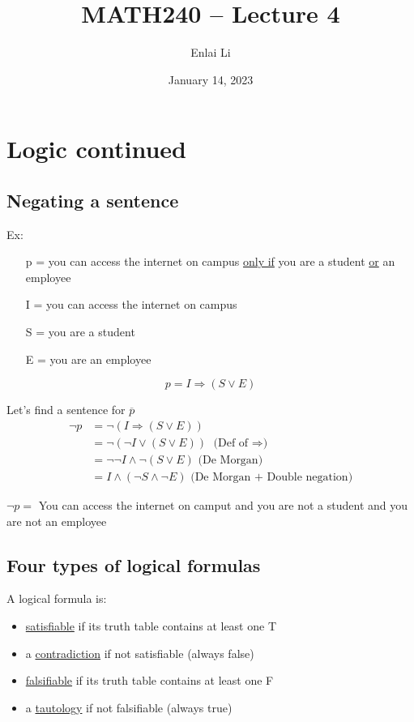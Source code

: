 \documentclass{article}
\author{Enlai Li}
\title{MATH240 -- Lecture 4}
\date{January 14, 2023}
\begin{document}
\maketitle
\section{Logic continued}
\subsection{Negating a sentence}
Ex:
\begin{itemize}
    \item [p =] you can access the internet on campus \underline{only if} you are a student \underline{or} an employee
    \item [I =] you can access the internet on campus
    \item [S =] you are a student
    \item [E =] you are an employee
\end{itemize}
\[
    p = I \Rightarrow (S \lor E)
\]

Let's find a sentence for $\overline{p}$
\begin{align*}
    \lnot p
     & = \lnot (I \Rightarrow (S \lor E))
    \\ & = \lnot (\lnot I \lor (S \lor E)) \text{ (Def of $\Rightarrow $)}
    \\ & = \lnot \lnot I \land \lnot(S \lor E) \text{ (De Morgan)}
    \\ & =  I \land (\lnot S \land \lnot E) \text{ (De Morgan + Double negation)}
\end{align*}

$ \lnot p =$ You can access the internet on camput and you are not a student and you are not an employee

\subsection{Four types of logical formulas}
A logical formula is:
\begin{itemize}
    \item \underline{satisfiable} if its truth table contains at least one T
    \item a \underline{contradiction} if not satisfiable (always false)
    \item \underline{falsifiable} if its truth table contains at least one F
    \item a \underline{tautology} if not falsifiable (always true)
\end{itemize}
\clearpage
\end{document}
